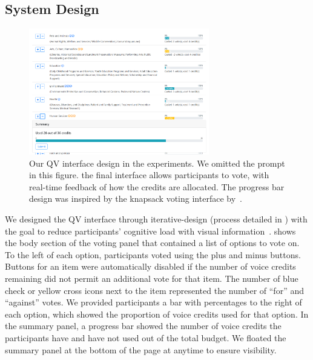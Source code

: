 \subsection{System Design}

\begin{figure}[htpb]
    \centering
    \includegraphics[width=0.7\textwidth, keepaspectratio=true]{content/image/qv-donation.png}
    \caption{
        Our QV interface design in the experiments. 
        We omitted the prompt in this figure.
        {}
        the final interface allows participants to vote, with real-time feedback of how the credits are allocated. 
        The progress bar design was inspired by the knapsack voting interface by~\cite{goel2015knapsack}.
    }
    \label{fig:qv_donation}
\end{figure}

We designed the QV interface through iterative-design (process detailed in ) with the goal to reduce participants' cognitive load with visual information~\cite{oviatt2006human}.  shows the body section of the voting panel that contained a list of options to vote on. To the left of each option, participants voted using the plus and minus buttons. Buttons for an item were automatically disabled if the number of voice credits remaining did not permit an additional vote for that item. The number of blue check or yellow cross icons next to the item represented the number of ``for'' and ``against'' votes. We provided participants a bar with percentages to the right of each option, which showed the proportion of voice credits used for that option.  In the summary panel, a progress bar showed the number of voice credits the participants have and have not used out of the total budget. We floated the summary panel at the bottom of the page at anytime to ensure visibility.

